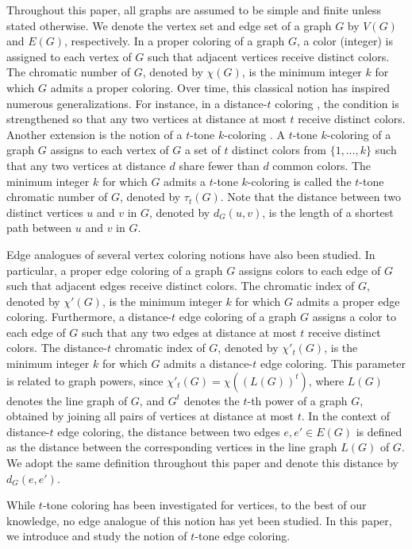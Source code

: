 \documentclass[12pt]{article}
\theoremstyle{plain}
\numberwithin{theorem}{section}
\numberwithin{conjecture}{section}
\numberwithin{corollary}{section}
\numberwithin{example}{section}
\numberwithin{lemma}{section}
\numberwithin{proposition}{section}
\numberwithin{problem}{section}
\numberwithin{remark}{section}
\numberwithin{claim}{theorem}
\numberwithin{definition}{section}
\begin{document}
Throughout this paper, all graphs are assumed to be simple and finite unless stated otherwise. We denote the vertex set and edge set of a graph $G$ by $V(G)$ and $E(G)$, respectively. In a proper coloring of a graph $G$, a color (integer) is assigned to each vertex of $G$ such that adjacent vertices receive distinct colors. The chromatic number of $G$, denoted by $\chi(G)$, is the minimum integer $k$ for which $G$ admits a proper coloring. Over time, this classical notion has inspired numerous generalizations. For instance, in a distance-$t$ coloring \cite{KS}, the condition is strengthened so that any two vertices at distance at most $t$ receive distinct colors. Another extension is the notion of a $t$-tone $k$-coloring \cite{BP, F}. A $t$-tone $k$-coloring of a graph $G$ assigns to each vertex of $G$ a set of $t$ distinct colors from $\{1,\dots,k\}$ such that any two vertices at distance $d$ share fewer than $d$ common colors. The minimum integer $k$ for which $G$ admits a $t$-tone $k$-coloring is called the $t$-tone chromatic number of $G$, denoted by $\tau_t(G)$. Note that the distance between two distinct vertices $u$ and $v$ in $G$, denoted by $d_G(u,v)$, is the length of a shortest path between $u$ and $v$ in $G$.

Edge analogues of several vertex coloring notions have also been studied. In particular, a proper edge coloring of a graph $G$ assigns colors to each edge of $G$ such that adjacent edges receive distinct colors. The chromatic index of $G$, denoted by $\chi'(G)$, is the minimum integer $k$ for which $G$ admits a proper edge coloring. Furthermore, a distance-$t$ edge coloring \cite{Kang} of a graph $G$ assigns a color to each edge of $G$ such that any two edges at distance at most $t$ receive distinct colors. The distance-$t$ chromatic index of $G$, denoted by $\chi'_t(G)$, is the minimum integer $k$ for which $G$ admits a distance-$t$ edge coloring. This parameter is related to graph powers, since $\chi'_t(G)=\chi((L(G))^t)$, where $L(G)$ denotes the line graph of $G$, and $G^t$ denotes the $t$-th power of a graph $G$, obtained by joining all pairs of vertices at distance at most $t$. In the context of distance-$t$ edge coloring, the distance between two edges $e,e'\in E(G)$ is defined as the distance between the corresponding vertices in the line graph $L(G)$ of $G$. We adopt the same definition throughout this paper and denote this distance by $d_G(e,e')$.

While $t$-tone coloring has been investigated for vertices, to the best of our knowledge, no edge analogue of this notion has yet been studied. In this paper, we introduce and study the notion of $t$-tone edge coloring.
\end{document}
